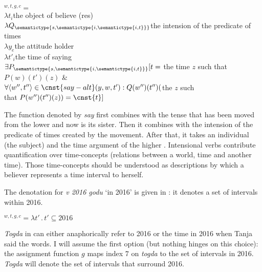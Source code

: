 \documentclass[output=paper,modfonts,newtxmath,hidelinks]{langscibook}
\begin{document}
\ea {}$^{w,t,g,c}={}$\smallskip\\
\hspace{0.5cm}$\lambda t_i$\tabto{3cm}the object of believe (res)\smallskip\\
\hspace{1cm}$\lambda Q_{\semantictype{s,\semantictype{i,\semantictype{i,t}}}}$\tabto{3.5cm}the intension of the predicate of times\smallskip\\
\hspace{1.5cm}$\lambda y_e$\tabto{4cm}the attitude holder\smallskip\\
\hspace{2cm}$\lambda t'_i$\tabto{4.5cm}the time of saying\smallskip\\
\hspace{2.5cm}$\exists P_{\semantictype{s,\semantictype{i,\semantictype{i,t}}}}[t={}$the time $z$ such that $P(w)(t')(z)$ \&\smallskip\\
\hspace{2.5cm}$\forall\langle w'',t''\rangle\in\cnst{say-alt}(y,w,t'): Q(w'')(t'')($the $z$ such\smallskip\\
\hspace{2.5cm}that $P(w'')(t'')(z))=\cnst{t}]$\label{20:ex36}
\z

\noindent The function denoted by \textit{say} first combines with the tense that has been moved from the lower  and now is its sister. Then it combines with the intension of the predicate of times created by the movement. After that, it takes an individual (the subject) and the time argument of the higher . Intensional verbs contribute quantification over time-concepts (relations between a world, time and another time). Those time-concepts should be understood as descriptions by which a believer represents a time interval to herself.

The denotation for \textit{v 2016 godu} ‘in 2016’ is given in : it denotes a set of intervals within 2016.

\ea {}$^{w,t,g,c}=\lambda t'\,.\,t'\subseteq 2016$\label{20:ex37}
\z

\noindent \textit{Togda} in  can either anaphorically refer to 2016 or the time in 2016 when Tanja said the words. I will assume the first option (but nothing hinges on this choice): the assignment function $g$ maps index $7$ on \textit{togda} to the set of intervals in 2016. \textit{Togda} will denote the set of intervals that surround 2016.
\end{document}
